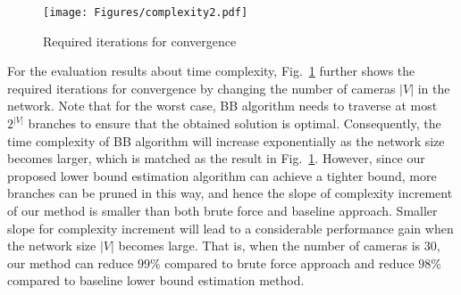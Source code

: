 
%
\begin{figure}
\begin{center}
\texttt{[image: Figures/complexity2.pdf]}
\caption{\label{fig::complexity} Required iterations for convergence}
\end{center}
\end{figure}
%
For the evaluation results about time complexity, Fig.~\ref{fig::complexity} further shows the required iterations for convergence by changing the number of cameras $|V|$ in the network.
Note that for the worst case, BB algorithm needs to traverse at most $2^{|V|}$ branches to ensure that the obtained solution is optimal.
Consequently, the time complexity of BB algorithm will increase exponentially as the network size becomes larger, which is matched as the result in Fig.~\ref{fig::complexity}.
However, since our proposed lower bound estimation algorithm can achieve a tighter bound, more branches can be pruned in this way, and hence the slope of complexity increment of our method is smaller than both brute force and baseline approach.
Smaller slope for complexity increment will lead to a considerable performance gain when the network size $|V|$ becomes large.
That is, when the number of cameras is $30$, our method can reduce $99\%$ compared to brute force approach and reduce $98\%$ compared to baseline lower bound estimation method.
%

